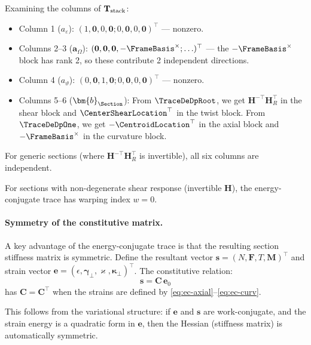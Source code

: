 Examining the columns of $\mathbf{T}_{\rm stack}$:
\begin{itemize}
\item Column 1 ($a_\varepsilon$): $(1, \mathbf{0}, 0, \mathbf{0}; 0, \mathbf{0}, 0, \mathbf{0})^\top$ — nonzero.
\item Columns 2--3 ($\bm{a}_\Omega$): $(\mathbf{0}, \mathbf{0}, \mathbf{0}, -\FrameBasis^\times; \ldots)^\top$ — 
the $-\FrameBasis^\times$ block has rank 2, so these contribute 2 independent directions.
\item Column 4 ($a_\vartheta$): $(0, \mathbf{0}, 1, \mathbf{0}; 0, \mathbf{0}, 0, \mathbf{0})^\top$ — nonzero.
\item Columns 5--6 ($\bm{b}_{\Section}$): From $\TraceDeDpRoot$, we get $\mathbf{H}^{-\top}\mathbf{H}_R^\top$ 
in the shear block and $\CenterShearLocation^\top$ in the twist block. From $\TraceDeDpOne$, 
we get $-\CentroidLocation^\top$ in the axial block and $-\FrameBasis^\times$ in the curvature block.
\end{itemize}

For generic sections (where $\mathbf{H}^{-\top}\mathbf{H}_R^\top$ is invertible), 
all six columns are independent.

\begin{proposition}
\label{prop:warp-index-romano}
For sections with non-degenerate shear response (invertible $\mathbf{H}$), the 
energy-conjugate trace has warping index $w = 0$.
\end{proposition}

\paragraph{Symmetry of the constitutive matrix.}

A key advantage of the energy-conjugate trace is that the resulting section 
stiffness matrix is symmetric. Define the resultant vector 
$\bm{s} = (N, \bm{F}, T, \bm{M})^\top$ and strain vector 
$\bm{e} = (\epsilon, \bm{\gamma}_\perp, \varkappa, \bm{\kappa}_\perp)^\top$. 
The constitutive relation:
\begin{equation}
\bm{s} = \mathbf{C}\,\bm{e}_0
\end{equation}
has $\mathbf{C} = \mathbf{C}^\top$ when the strains are defined by 
\eqref{eq:ec-axial}--\eqref{eq:ec-curv}.

This follows from the variational structure: if $\bm{e}$ and $\bm{s}$ are 
work-conjugate, and the strain energy is a quadratic form in $\bm{e}$, then 
the Hessian (stiffness matrix) is automatically symmetric.

